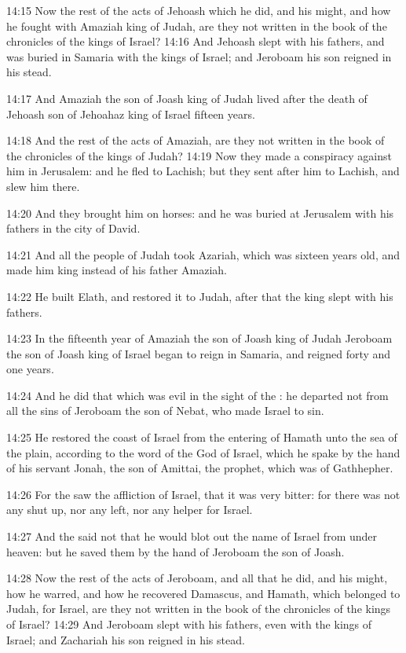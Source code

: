 14:15 Now the rest of the acts of Jehoash which he did, and his might,
and how he fought with Amaziah king of Judah, are they not written in
the book of the chronicles of the kings of Israel?  14:16 And Jehoash
slept with his fathers, and was buried in Samaria with the kings of
Israel; and Jeroboam his son reigned in his stead.

14:17 And Amaziah the son of Joash king of Judah lived after the death
of Jehoash son of Jehoahaz king of Israel fifteen years.

14:18 And the rest of the acts of Amaziah, are they not written in the
book of the chronicles of the kings of Judah?  14:19 Now they made a
conspiracy against him in Jerusalem: and he fled to Lachish; but they
sent after him to Lachish, and slew him there.

14:20 And they brought him on horses: and he was buried at Jerusalem
with his fathers in the city of David.

14:21 And all the people of Judah took Azariah, which was sixteen
years old, and made him king instead of his father Amaziah.

14:22 He built Elath, and restored it to Judah, after that the king
slept with his fathers.

14:23 In the fifteenth year of Amaziah the son of Joash king of Judah
Jeroboam the son of Joash king of Israel began to reign in Samaria,
and reigned forty and one years.

14:24 And he did that which was evil in the sight of the \LORD: he
departed not from all the sins of Jeroboam the son of Nebat, who made
Israel to sin.

14:25 He restored the coast of Israel from the entering of Hamath unto
the sea of the plain, according to the word of the \LORD God of Israel,
which he spake by the hand of his servant Jonah, the son of Amittai,
the prophet, which was of Gathhepher.

14:26 For the \LORD saw the affliction of Israel, that it was very
bitter: for there was not any shut up, nor any left, nor any helper
for Israel.

14:27 And the \LORD said not that he would blot out the name of Israel
from under heaven: but he saved them by the hand of Jeroboam the son
of Joash.

14:28 Now the rest of the acts of Jeroboam, and all that he did, and
his might, how he warred, and how he recovered Damascus, and Hamath,
which belonged to Judah, for Israel, are they not written in the book
of the chronicles of the kings of Israel?  14:29 And Jeroboam slept
with his fathers, even with the kings of Israel; and Zachariah his son
reigned in his stead.

